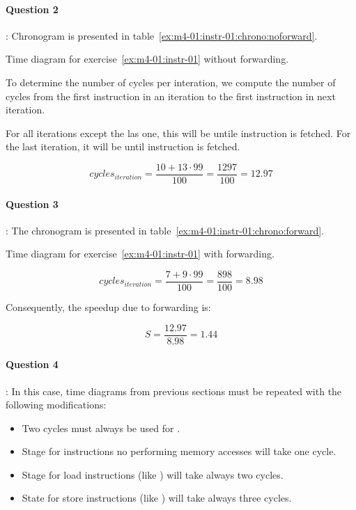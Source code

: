 \paragraph{Question 2}: Chronogram is presented in table~\ref{ex:m4-01:instr-01:chrono:noforward}.

\begin{table}[htb]

\caption{Time diagram for exercise~\ref{ex:m4-01:instr-01} without forwarding.}
\label{ex:m4-01:instr-01:chrono:noforward}
\end{table}

To determine the number of cycles per interation, we compute the number of cycles
from the first instruction in an iteration to the first instruction in next iteration.

For all iterations except the las one, this will be untile instruction 
is fetched. For the last iteration, it will be until instruction  
is fetched.

\[
cycles_{iteration} = \frac{10 + 13 \cdot 99}{100} = \frac{1297}{100} = 12.97
\]

\paragraph{Question 3}: 
The chronogram is presented in table~\ref{ex:m4-01:instr-01:chrono:forward}.

\begin{table}[htb]

\caption{Time diagram for exercise~\ref{ex:m4-01:instr-01} with forwarding.}
\label{ex:m4-01:instr-01:chrono:forward}
\end{table}

\[
cycles_{iteration} = \frac{7 + 9 \cdot 99}{100} = \frac{898}{100} = 8.98
\]

Consequently, the speedup due to forwarding is:

\[
S = \frac{12.97}{8.98} = 1.44
\]

\paragraph{Question 4}: 
In this case, time diagrams from previous sections must be repeated with the
following modifications:
\begin{itemize}
  \item Two cycles must always be used for .
  \item Stage  for instructions no performing memory accesses will take one cycle.
  \item Stage  for load instructions (like ) will take always two cycles.
  \item State  for store instructions (like ) will take always three cycles.
\end{itemize}
